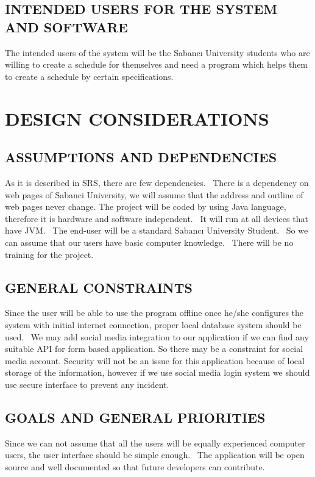 \documentclass[twoside,letterpaper]{article}
\begin{document}
\subsection{INTENDED USERS FOR THE SYSTEM AND SOFTWARE}

The intended users of the system will be the Sabanc\i{} University students who are willing to create a schedule for themselves and need a program which helps them to create a schedule by certain specifications.

\clearpage\pagestyle{Standard}
\section{DESIGN CONSIDERATIONS}
\label{sec:considerations}
\subsection{ASSUMPTIONS AND DEPENDENCIES}

As it is described in SRS, there are few dependencies. \ There is a dependency on web pages of Sabanci University, we will assume that the address and outline of web pages never change. The project will be coded by using Java language, therefore it is hardware and software independent. \  It will run at all devices that have JVM. \ The end-user will be a standard Sabanc\i{} University Student. \ So we can assume that our users have basic computer knowledge. \ There will be no training for the project. 

\subsection{GENERAL CONSTRAINTS}
Since the user will be able to use the program offline once he/she configures the system with initial internet connection, proper local database system should be used. \  We may add social media integration to our application if we can find any suitable API for form based application. So there may be a constraint for social media account.  Security will not be an issue for this application because of local storage of the information, however if we use social media login system we should use secure interface to prevent any incident.



\subsection{GOALS AND GENERAL PRIORITIES}
Since we can not assume that all the users will be equally experienced computer users, the user interface should be simple enough. \ The application will be open source and well documented so that future developers can contribute.
\end{document}

